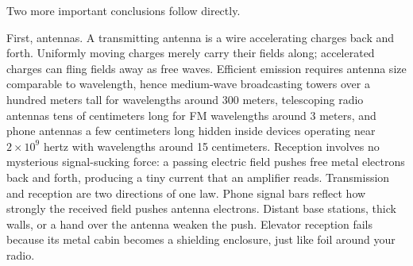 \begin{mainline}
Two more important conclusions follow directly.

First, antennas. A transmitting antenna is a wire accelerating charges back and forth. Uniformly moving charges merely carry their fields along; accelerated charges can fling fields away as free waves. Efficient emission requires antenna size comparable to wavelength, hence medium-wave broadcasting towers over a hundred meters tall for wavelengths around 300 meters, telescoping radio antennas tens of centimeters long for FM wavelengths around 3 meters, and phone antennas a few centimeters long hidden inside devices operating near $2\times10^{9}$ hertz with wavelengths around 15 centimeters. Reception involves no mysterious signal-sucking force: a passing electric field pushes free metal electrons back and forth, producing a tiny current that an amplifier reads. Transmission and reception are two directions of one law. Phone signal bars reflect how strongly the received field pushes antenna electrons. Distant base stations, thick walls, or a hand over the antenna weaken the push. Elevator reception fails because its metal cabin becomes a shielding enclosure, just like foil around your radio.

\begin{center}
\end{center}


\end{mainline}
